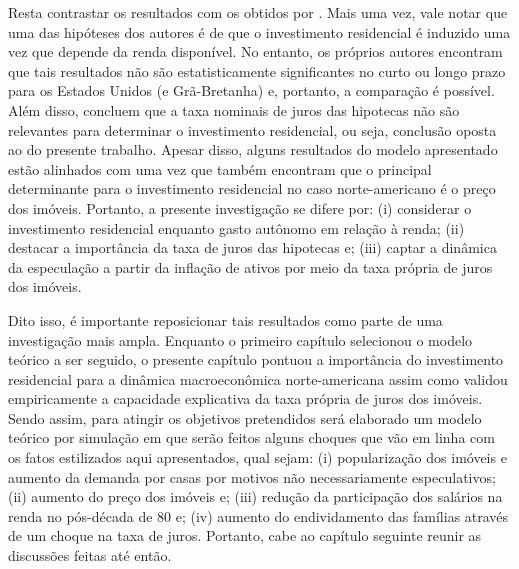 Resta contrastar os resultados com os obtidos por \textcite{arestis_residential_2015}. Mais uma vez, vale notar que uma das hipóteses dos autores é de que o investimento residencial é induzido uma vez que depende da renda disponível. No entanto, os próprios autores encontram que tais resultados não são estatisticamente significantes no curto ou longo prazo para os Estados Unidos (e Grã-Bretanha) e, portanto, a comparação é possível. Além disso, concluem que a taxa nominais de juros das hipotecas não são relevantes para determinar o investimento residencial, ou seja, conclusão oposta ao do presente trabalho. Apesar disso, alguns resultados do modelo apresentado estão alinhados com \textcite{arestis_residential_2015} uma vez que também encontram que o principal determinante para o investimento residencial no caso norte-americano é o preço dos imóveis. Portanto, a presente investigação se difere por: (i) considerar o investimento residencial enquanto gasto autônomo em relação à renda; (ii) destacar a importância da taxa de juros das hipotecas e; (iii) captar a dinâmica da especulação a partir da inflação de ativos por meio da taxa própria de juros dos imóveis.  

Dito isso, é importante reposicionar tais resultados como parte de uma investigação mais ampla.
Enquanto o primeiro capítulo selecionou o modelo teórico a ser seguido, o presente capítulo pontuou a importância do investimento residencial para a dinâmica macroeconômica norte-americana assim como validou empiricamente a capacidade explicativa da taxa própria de juros dos imóveis.
Sendo assim, para atingir os objetivos pretendidos será elaborado um modelo teórico por simulação em que serão feitos alguns choques que vão em linha com os fatos estilizados aqui apresentados, qual sejam:
(i) popularização dos imóveis e aumento da demanda por casas por motivos não necessariamente especulativos;
(ii) aumento do preço dos imóveis e;
(iii) redução da participação dos salários na renda no pós-década de 80 e;
(iv) aumento do endividamento das famílias através de um choque na taxa de juros.
Portanto, cabe ao capítulo seguinte reunir as discussões feitas até então.



